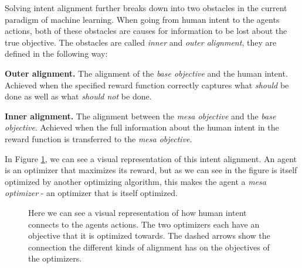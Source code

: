 \documentclass[12pt,A4]{report}
\theoremstyle{definition}
\begin{document}
Solving intent alignment further breaks down into two obstacles in the current paradigm of machine learning. When going from human intent to the agents actions, both of these obstacles are causes for information to be lost about the true objective. The obstacles are called \textit{inner} and \textit{outer alignment}, they are defined in the following way:

\begin{displayquote} 
\textbf{Outer alignment.} 
The alignment of the \textit{base objective} and the human intent. Achieved when the specified reward function correctly captures what \textit{should} be done as well as what \textit{should not} be done.
\end{displayquote} 

\begin{displayquote} 
  \textbf{Inner alignment.} 
The alignment between the \textit{mesa objective} and the \textit{base objective}. Achieved when the full information about the human intent in the reward function is transferred to the \textit{mesa objective}.
\end{displayquote} 

In Figure \ref{fig:alignment}, we can see a visual representation of this intent alignment. An agent is an optimizer that maximizes its reward, but as we can see in the figure is itself optimized by another optimizing algorithm, this makes the agent a \textit{mesa optimizer} - an optimizer that is itself optimized. 



\begin{figure}[H]
  
  \caption{Here we can see a visual representation of how human intent connects to the agents actions. The two optimizers each have an objective that it is optimized towards. The dashed arrows show the connection the different kinds of alignment has on the objectives of the optimizers. }
  \label{fig:alignment}
\end{figure}

\begin{figure}[H]
  
  \label{fig:RL}
\end{figure}

\end{document}
